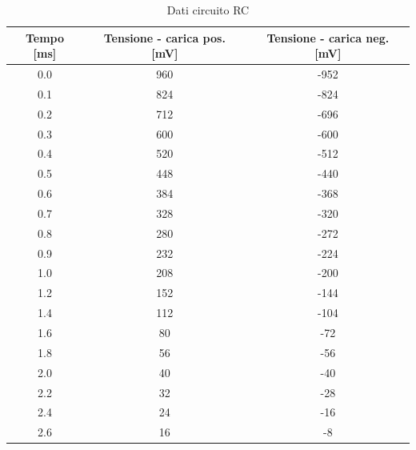 \documentclass[letterpaper,12pt]{article}
\begin{document}
\begin{table}[htbp]
    \centering
    \caption{Dati circuito RC}
    \begin{tabular}{ccc}
        \toprule
        Tempo [ms] & Tensione - carica pos. [mV] & Tensione - carica neg. [mV]\\
        \midrule
        0.0 & 960 & -952 \\
        0.1 & 824 & -824 \\
        0.2 & 712 & -696 \\
        0.3 & 600 & -600 \\
        0.4 & 520 & -512 \\
        0.5 & 448 & -440 \\
        0.6 & 384 & -368 \\
        0.7 & 328 & -320 \\
        0.8 & 280 & -272 \\
        0.9 & 232 & -224 \\
        1.0 & 208 & -200 \\
        1.2 & 152 & -144 \\
        1.4 & 112 & -104 \\
        1.6 & 80 & -72 \\
        1.8 & 56 & -56 \\
        2.0 & 40 & -40 \\
        2.2 & 32 & -28 \\
        2.4 & 24 & -16 \\
        2.6 & 16 & -8 \\
        \bottomrule
    \end{tabular}
    \label{tab:dati_RC}
\end{table}
\end{document}

